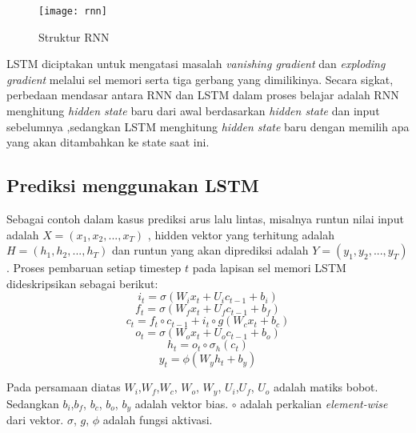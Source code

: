 \documentclass[../thesis.tex]{subfiles}
\begin{document}
\begin{figure}
	\centering
	\texttt{[image: rnn]}
	\caption{Struktur RNN}
	\label{arsi_rnn}
\end{figure}

LSTM diciptakan untuk mengatasi masalah \textit{vanishing gradient} dan \textit{exploding gradient} melalui sel memori serta tiga gerbang yang dimilikinya. Secara sigkat, perbedaan mendasar antara RNN dan LSTM dalam proses belajar adalah  RNN menghitung \textit{hidden state} baru dari awal berdasarkan \textit{hidden state} dan input sebelumnya ,sedangkan LSTM menghitung \textit{hidden state} baru dengan memilih apa yang akan ditambahkan ke state saat ini.


\subsection{Prediksi menggunakan LSTM}
Sebagai contoh dalam kasus prediksi arus lalu lintas, misalnya runtun nilai input adalah $X = (x_{1},x_{2},...,x_{T})$ , hidden vektor yang terhitung adalah $H = (h_{1},h_{2},...,h_{T})$ dan runtun yang akan diprediksi adalah $Y = (y_{1},y_{2},...,y_{T})$. 
Proses pembaruan setiap timestep $t$ pada lapisan sel memori LSTM dideskripsikan sebagai berikut:
\begin{equation} \label{input_gate}
 i_{t} = \sigma(W_{i}x_{t} + U_{i}c_{t-1}+b_{i})
\end{equation}
\begin{equation} \label{forget_gate}
	f_{t} = \sigma(W_{f}x_{t} + U_{f}c_{t-1}+b_{f})
\end{equation}
\begin{equation} \label{cell_state}
	c_{t} = f_{t}\circ c_{t-1} + i_{t}\circ g(W_{c}x_{t}+b_{c})
\end{equation}
\begin{equation} \label{output_gate}
	o_{t} = \sigma(W_{o}x_{t} + U_{o}c_{t-1}+b_{o})
\end{equation}
\begin{equation} \label{hidden_state}
	h_{t} = o_{t} \circ \sigma_{h}(c_{t})
\end{equation}
\begin{equation} \label{result_gate}
	y_{t} = \phi(W_{y}h_{t} + b_{y})
\end{equation}

Pada persamaan diatas $W_{i}$,$W_{f}$,$W_{c}$, $W_{o}$, $W_{y}$, $U_{i}$,$U_{f}$, $U_{o}$ adalah matiks bobot. Sedangkan $b_{i}$,$b_{f}$, $b_{c}$, $b_{o}$, $b_{y}$ adalah vektor bias.
$\circ$ adalah perkalian \textit{element-wise} dari vektor. $\sigma$, $g$, $\phi$ adalah fungsi aktivasi.
\end{document}
